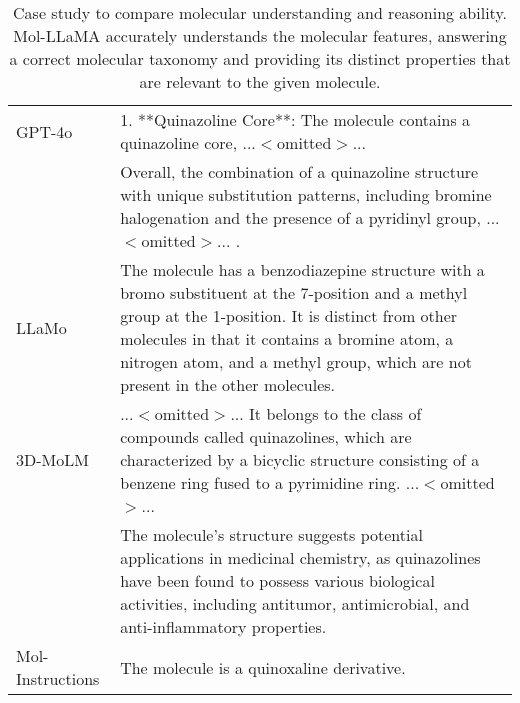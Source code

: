 \begin{table*}[ht!]
\begin{tabular}{p{2.15cm} p{14.05cm}}
\midrule
GPT-4o & 1. **Quinazoline Core**: The molecule contains a \textcolor{tabred}{quinazoline core}, ...$<$omitted$>$... \\
 & Overall, the combination of a \textcolor{tabred}{quinazoline} structure with unique substitution patterns, including bromine halogenation and the presence of a pyridinyl group, ...$<$omitted$>$... . \\
\midrule
LLaMo & The molecule has a \textcolor{tabblue}{benzodiazepine} structure with a bromo substituent at the 7-position and \textcolor{tabred}{a methyl group at the 1-position}. It is distinct from other molecules in that it contains a bromine atom, a nitrogen atom, and a methyl group, which are not present in the other molecules. \\
\midrule
3D-MoLM & ...$<$omitted$>$... It belongs to the class of compounds called \textcolor{tabred}{quinazolines}, which are characterized by a bicyclic structure consisting of a benzene ring fused to a pyrimidine ring. ...$<$omitted$>$...\\
& The molecule's structure suggests potential applications in medicinal chemistry, as quinazolines have been found to possess various biological activities, including \textcolor{tabred}{antitumor, antimicrobial, and anti-inflammatory properties.} \\
\midrule
Mol-Instructions & The molecule is a \textcolor{tabred}{quinoxaline derivative}. \\
\bottomrule
\end{tabular}
\vspace{-0.1in}
\caption{\small Case study to compare molecular understanding and reasoning ability. Mol-LLaMA accurately understands the molecular features, answering a correct molecular taxonomy and providing its distinct properties that are relevant to the given molecule.}
\label{tab:qualitative}
\vspace{-0.1in}
\end{table*}